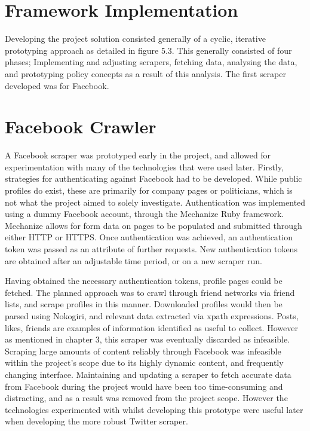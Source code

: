 \section{Framework Implementation}

Developing the project solution consisted generally of a cyclic, iterative prototyping approach as detailed in figure 5.3. This generally consisted of four phases; Implementing and adjusting scrapers, fetching data, analysing the data, and prototyping policy concepts as a result of this analysis. The first scraper developed was for Facebook. 


\section{Facebook Crawler}

A Facebook scraper was prototyped early in the project, and allowed for experimentation with many of the technologies that were used later. Firstly, strategies for authenticating against Facebook had to be developed. While public profiles do exist, these are primarily for company pages or politicians, which is not what the project aimed to solely investigate. Authentication was implemented using a dummy Facebook account, through the Mechanize Ruby framework. Mechanize allows for form data on pages to be populated and submitted through either HTTP or HTTPS. Once authentication was achieved, an authentication token was passed as an attribute of further requests. New authentication tokens are obtained after an adjustable time period, or on a new scraper run. 

Having obtained the necessary authentication tokens, profile pages could be fetched. The planned approach was to crawl through friend networks via friend lists, and scrape profiles in this manner. Downloaded profiles would then be parsed using Nokogiri, and relevant data extracted via xpath expressions. Posts, likes, friends are examples of information identified as useful to collect. However as mentioned in chapter 3, this scraper was eventually discarded as infeasible. Scraping large amounts of content reliably through Facebook was infeasible within the project's scope due to its highly dynamic content, and frequently changing interface. Maintaining and updating a scraper to fetch accurate data from Facebook during the project would have been too time-consuming and distracting, and as a result was removed from the project scope. However the technologies experimented with whilst developing this prototype were useful later when developing the more robust Twitter scraper.

